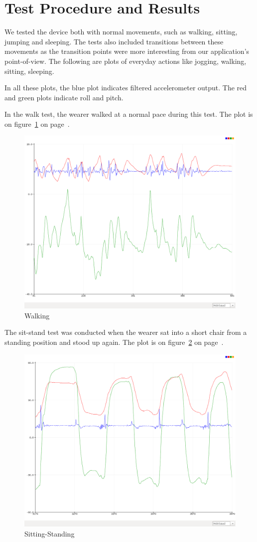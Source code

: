 \documentclass[11pt, a4paper]{article}
\begin{document}
\section{Test Procedure and Results}
We tested the device both with normal movements, such as walking, sitting,
jumping and sleeping. The tests also included transitions between these
movements as the transition points were more interesting from our
application's point-of-view. The following are plots of everyday actions
like jogging, walking, sitting, sleeping.

\noindent In all these plots, the blue plot indicates filtered accelerometer
output. The red and green plots indicate roll and pitch.

\noindent In the walk test, the wearer walked at a normal pace during this
test. The plot is on figure~\ref{fig:walk} on page~\pageref{fig:walk}.
\begin{figure}
    \centering
    \includegraphics[width=0.7\linewidth]{walk.png}
    \caption{Walking}
    \label{fig:walk}
\end{figure}

\noindent The sit-stand test was conducted when the wearer sat into a short chair from a standing position and stood up again. The plot is on figure~\ref{fig:ss} on page~\pageref{fig:ss}.
\begin{figure}
    \centering
    \includegraphics[width=0.7\linewidth]{sit-stand.png}
    \caption{Sitting-Standing}
    \label{fig:ss}
\end{figure}
\end{document}
